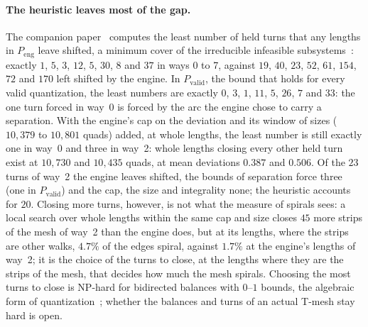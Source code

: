 \documentclass[11pt,a4paper]{article}
\begin{document}
\paragraph{The heuristic leaves most of the gap.}
The companion paper~\cite{gardent2026turns} computes the least number of
held turns that any lengths in $P_{\mathrm{eng}}$ leave shifted, a minimum
cover of the irreducible infeasible subsystems~\cite{parker1996iis}: exactly
$1$, $5$, $3$, $12$, $5$, $30$, $8$ and $37$ in ways 0 to 7, against $19$,
$40$, $23$, $52$, $61$, $154$, $72$ and $170$ left shifted by the engine. In
$P_{\mathrm{valid}}$, the bound that holds for every valid quantization, the
least numbers are exactly $0$, $3$, $1$, $11$, $5$, $26$, $7$ and 33: the one
turn forced in way~0 is forced by the arc the engine chose to carry a
separation.
With the engine's cap on the deviation and its window of sizes ($10{,}379$
to $10{,}801$ quads) added, at whole lengths, the least number is still
exactly one in way~0 and three in way~2: whole lengths closing every other
held turn exist at $10{,}730$ and $10{,}435$ quads, at mean deviations
$0.387$ and $0.506$. Of the $23$ turns of way~2 the engine leaves shifted,
the bounds of separation force three (one in $P_{\mathrm{valid}}$) and the
cap, the size and integrality none; the heuristic accounts for $20$. Closing more turns, however, is not
what the measure of spirals sees: a local search over whole lengths within
the same cap and size closes $45$ more strips of the mesh of way~2 than the
engine does, but at its lengths, where the strips are other walks, $4.7\%$
of the edges spiral, against $1.7\%$ at the engine's lengths of way~2; it is
the choice of the turns to close, at the lengths where they are the strips
of the mesh, that decides how much the mesh spirals. Choosing the most turns to close
is NP-hard for bidirected balances with $0$--$1$ bounds, the algebraic form
of quantization~\cite{gardent2026turns}; whether the balances and turns of an
actual T-mesh stay hard is open.
\end{document}
